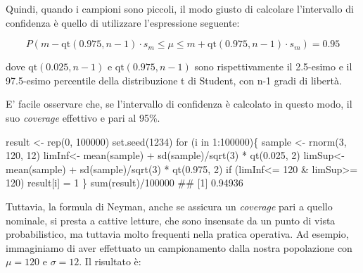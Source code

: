 \documentclass[a4paper,12pt,oneside]{book}
\newenvironment{Shaded}{\begin{snugshade}}{\end{snugshade}}
\newcommand{\DecValTok}[1]{#1}
\newcommand{\FloatTok}[1]{#1}
\newcommand{\SpecialCharTok}[1]{#1}
\newcommand{\DocumentationTok}[1]{#1}
\newcommand{\OtherTok}[1]{#1}
\newcommand{\FunctionTok}[1]{#1}
\newcommand{\ControlFlowTok}[1]{#1}
\newcommand{\NormalTok}[1]{#1}
\begin{document}
Quindi, quando i campioni sono piccoli, il modo giusto di calcolare l'intervallo di confidenza è quello di utilizzare l'espressione seguente:

\[P \left( m - \textrm{qt}(0.975,n - 1) \cdot s_m \le \mu  \le m + \textrm{qt}(0.975,n - 1) \cdot s_m \right) = 0.95\]

dove \(\textrm{qt}(0.025,n - 1)\) e \(\textrm{qt}(0.975,n - 1)\) sono rispettivamente il 2.5-esimo e il 97.5-esimo percentile della distribuzione t di Student, con n-1 gradi di libertà.

E' facile osservare che, se l'intervallo di confidenza è calcolato in questo modo, il suo \emph{coverage} effettivo e pari al 95\%.

\begin{Shaded}
\begin{Highlighting}[]
\NormalTok{result }\OtherTok{\textless{}{-}} \FunctionTok{rep}\NormalTok{(}\DecValTok{0}\NormalTok{, }\DecValTok{100000}\NormalTok{)}
\FunctionTok{set.seed}\NormalTok{(}\DecValTok{1234}\NormalTok{)}
\ControlFlowTok{for}\NormalTok{ (i }\ControlFlowTok{in} \DecValTok{1}\SpecialCharTok{:}\DecValTok{100000}\NormalTok{)\{}
\NormalTok{  sample }\OtherTok{\textless{}{-}} \FunctionTok{rnorm}\NormalTok{(}\DecValTok{3}\NormalTok{, }\DecValTok{120}\NormalTok{, }\DecValTok{12}\NormalTok{)}
\NormalTok{  limInf}\OtherTok{\textless{}{-}} \FunctionTok{mean}\NormalTok{(sample) }\SpecialCharTok{+} \FunctionTok{sd}\NormalTok{(sample)}\SpecialCharTok{/}\FunctionTok{sqrt}\NormalTok{(}\DecValTok{3}\NormalTok{) }\SpecialCharTok{*} \FunctionTok{qt}\NormalTok{(}\FloatTok{0.025}\NormalTok{, }\DecValTok{2}\NormalTok{) }
\NormalTok{  limSup}\OtherTok{\textless{}{-}} \FunctionTok{mean}\NormalTok{(sample) }\SpecialCharTok{+} \FunctionTok{sd}\NormalTok{(sample)}\SpecialCharTok{/}\FunctionTok{sqrt}\NormalTok{(}\DecValTok{3}\NormalTok{) }\SpecialCharTok{*} \FunctionTok{qt}\NormalTok{(}\FloatTok{0.975}\NormalTok{, }\DecValTok{2}\NormalTok{) }
  \ControlFlowTok{if}\NormalTok{ (limInf}\SpecialCharTok{\textless{}=} \DecValTok{120} \SpecialCharTok{\&}\NormalTok{ limSup}\SpecialCharTok{\textgreater{}=} \DecValTok{120}\NormalTok{) result[i] }\OtherTok{=} \DecValTok{1}
\NormalTok{\}}
\FunctionTok{sum}\NormalTok{(result)}\SpecialCharTok{/}\DecValTok{100000}
\DocumentationTok{\#\# [1] 0.94936}
\end{Highlighting}
\end{Shaded}

Tuttavia, la formula di Neyman, anche se assicura un \emph{coverage} pari a quello nominale, si presta a cattive letture, che sono insensate da un punto di vista probabilistico, ma tuttavia molto frequenti nella pratica operativa. Ad esempio, immaginiamo di aver effettuato un campionamento dalla nostra popolazione con \(\mu = 120\) e \(\sigma = 12\). Il risultato è:
\end{document}
